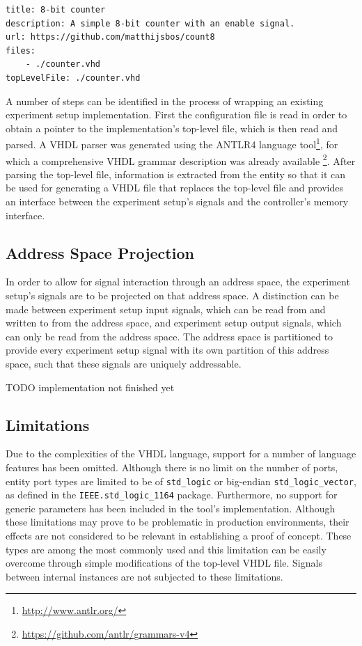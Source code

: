 \documentclass[main.tex]{subfiles}
\begin{document}
\begin{lstlisting}[caption={Example \texttt{fpgaedu.yaml} wrapper configuration file for a simple 8-bit counter implementation.}, label={lst:wrapper-configuration}]
title: 8-bit counter
description: A simple 8-bit counter with an enable signal.
url: https://github.com/matthijsbos/count8
files: 
    - ./counter.vhd
topLevelFile: ./counter.vhd
\end{lstlisting}

A number of steps can be identified in the process of wrapping an existing experiment setup implementation. First the configuration file is read in order to obtain a pointer to the implementation's top-level file, which is then read and parsed. A VHDL parser was generated using the ANTLR4 language tool\footnote{\url{http://www.antlr.org/}}, for which a comprehensive VHDL grammar description was already available \footnote{\url{https://github.com/antlr/grammars-v4}}. After parsing the top-level file, information is extracted from the entity so that it can be used for generating a VHDL file that replaces the top-level file and provides an interface between the experiment setup's signals and the controller's memory interface. 

\subsection{Address Space Projection}
In order to allow for signal interaction through an address space, the experiment setup's signals are to be projected on that address space. A distinction can be made between experiment setup input signals, which can be read from and written to from the address space, and experiment setup output signals, which can only be read from the address space. The address space is partitioned to provide every experiment setup signal with its own partition of this address space, such that these signals are uniquely addressable. 

TODO implementation not finished yet


\subsection{Limitations}
Due to the complexities of the VHDL language, support for a number of language features has been omitted. Although there is no limit on the number of ports, entity port types are limited to be of \texttt{std\_logic} or big-endian \texttt{std\_logic\_vector}, as defined in the \texttt{IEEE.std\_logic\_1164} package. Furthermore, no support for generic parameters has been included in the tool's implementation. Although these limitations may prove to be problematic in production environments, their effects are not considered to be relevant in establishing a proof of concept. These types are among the most commonly used and this limitation can be easily overcome through simple modifications of the top-level VHDL file. Signals between internal instances are not subjected to these limitations.
\end{document}
